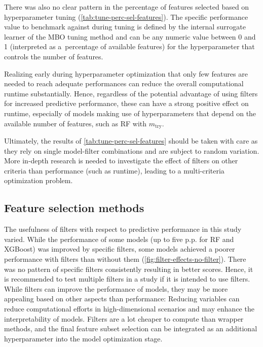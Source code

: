 \documentclass[remotesensing,article,submit,moreauthors,pdftex]{Definitions/mdpi}
\begin{document}
There was also no clear pattern in the percentage of features selected based on hyperparameter tuning (\autoref{tab:tune-perc-sel-features}).
The specific performance value to benchmark against during tuning is defined by the internal surrogate learner of the MBO tuning method and can be any numeric value between 0 and 1 (interpreted as a\ percentage of available features) for the hyperparameter that controls the number of features.

Realizing early during hyperparameter optimization that only few features are needed to reach adequate performances can reduce the overall computational runtime substantially.
Hence, regardless of the potential advantage of using filters for increased predictive performance, these can have a strong positive effect on runtime, especially of models making use of hyperparameters that depend on the available number of features, such as RF with $m_\textrm{try}$.

Ultimately, the results of \autoref{tab:tune-perc-sel-features} should be taken with care as they rely on single model-filter combinations and are subject to random variation.
More in-depth research is needed to investigate the effect of filters on other criteria than performance (such as runtime), leading to a multi-criteria optimization problem.

\subsection{Feature selection methods}

The usefulness of filters with respect to predictive performance in this study varied.
While the performance of some models (up to five p.p. for RF and XGBoost) was improved by specific filters, some models achieved a poorer performance with filters than without them (\autoref{fig:filter-effects-no-filter}).
There was no pattern of specific filters consistently resulting in better scores.
Hence, it is recommended to test multiple filters in a study if it is intended to use filters.
While filters can improve the performance of models, they may be more appealing based on other aspects than performance: Reducing variables can reduce computational efforts in high-dimensional scenarios and may enhance the interpretability of models.
Filters are a lot cheaper to compute than wrapper methods, and the final feature subset selection can be integrated as an additional hyperparameter into the model optimization stage.
\end{document}
